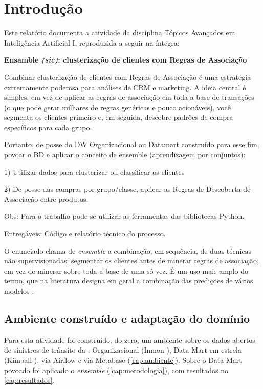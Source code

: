 
\chapter{Introdução}
\label{cap:intro}

Este relatório documenta a atividade da disciplina Tópicos Avançados em
Inteligência Artificial I, reproduzida a seguir na íntegra:

\begin{citacao}
\textbf{Ensamble \textit{(sic)}: clusterização de clientes com Regras de Associação}

Combinar clusterização de clientes com Regras de Associação é uma estratégia
extremamente poderosa para análises de CRM e marketing. A ideia central é
simples: em vez de aplicar as regras de associação em toda a base de
transações (o que pode gerar milhares de regras genéricas e pouco
acionáveis), você segmenta os clientes primeiro e, em seguida, descobre
padrões de compra específicos para cada grupo.

Portanto, de posse do DW Organizacional ou Datamart construído para esse fim,
povoar o BD e aplicar o conceito de ensemble (aprendizagem por conjuntos):

1) Utilizar dados para clusterizar ou classificar os clientes

2) De posse das compras por grupo/classe, aplicar as Regras de Descoberta de
Associação entre produtos.

Obs: Para o trabalho pode-se utilizar as ferramentas das bibliotecas Python.

Entregáveis: Código e relatório técnico do processo.
\end{citacao}

O enunciado chama de \textit{ensemble} a combinação, em sequência, de duas
técnicas não supervisionadas: segmentar os clientes antes de minerar regras
de associação, em vez de minerar sobre toda a base de uma só vez. É um uso
mais amplo do termo, que na literatura designa em geral a combinação das
predições de vários modelos \cite{dietterich2000}.

\section{Ambiente construído e adaptação do domínio}
\label{sec:ambiente-dominio}

Para esta atividade foi construído, do zero, um ambiente sobre os dados
abertos de sinistros de trânsito da 
\cite{prfdatatran}:  Organizacional (Inmon
\cite{inmon2005}), Data Mart em estrela (Kimball \cite{kimball2013}),
 via Airflow e  via Metabase (\autoref{cap:ambiente}). Sobre o Data Mart
povoado foi aplicado o \textit{ensemble} (\autoref{cap:metodologia}), com
resultados no \autoref{cap:resultados}.


